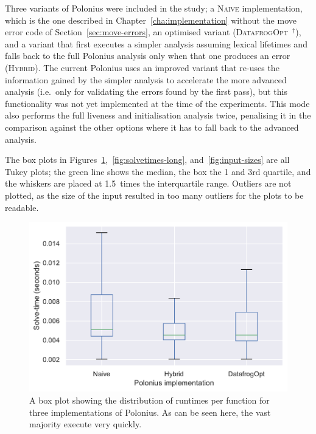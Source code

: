 \documentclass[11pt,a4paper,twoside,openany]{report}
\newcommand{\notmine}[0] {$^\dagger$}
\renewcommand\_{\textunderscore\allowbreak}
\begin{document}
Three variants of Polonius were included in the study; a \textsc{Naive}
implementation, which is the one described in Chapter~\ref{cha:implementation}
without the move error code of Section~\ref{sec:move-errors}, an optimised
variant (\textsc{DatafrogOpt}~\notmine{}), and a variant that first executes a
simpler analysis assuming lexical lifetimes and falls back to the full Polonius
analysis only when that one produces an error (\textsc{Hybrid}). The current
Polonius uses an improved variant that re-uses the information gained by the
simpler analysis to accelerate the more advanced analysis (i.e.\ only for
validating the errors found by the first pass), but this
functionality was not yet implemented at the time of the experiments. This mode
also performs the full liveness and initialisation analysis twice, penalising it
in the comparison against the other options where it has to fall back to the
advanced analysis.

The box plots in Figures~\ref{fig:solvetimes},~\ref{fig:solvetimes-long},
and~\ref{fig:input-sizes} are all Tukey plots; the green line shows the median,
the box the 1 and 3rd quartile, and the whiskers are placed at 1.5~times the
interquartile range. Outliers are not plotted, as the size of the input resulted
in too many outliers for the plots to be readable.

\begin{figure}
  \includegraphics[width=0.9\linewidth]{Graphs/solvetimes_boxplot.pdf}
  \caption[Runtimes Per Function for Three Polonius Variants]{A box plot
    showing the distribution of runtimes per function for three
    implementations of Polonius. As can be seen here, the vast majority execute
    very quickly.}\label{fig:solvetimes}
\end{figure}
\end{document}
